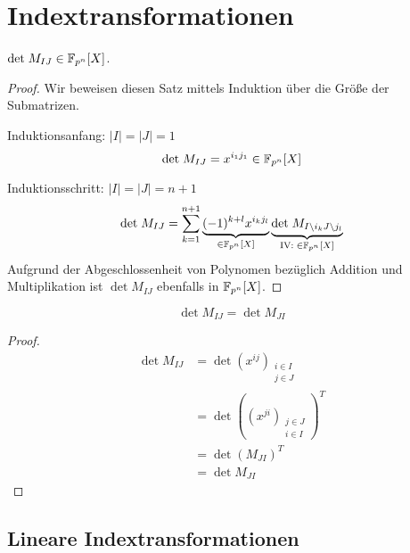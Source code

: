 \section{Indextransformationen}

\begin{lemma} \label{lemma:det-polynom}
    $\det M_{IJ} \in \field{p}[n][X]$.
\end{lemma}

\begin{proof}
    Wir beweisen diesen Satz mittels Induktion über die Größe der Submatrizen. 

    Induktionsanfang: $|I| = |J| = 1$
    \begin{equation*}
        \det M_{IJ} = x^{i_1j_1} \in \field{p}[n][X]
    \end{equation*}

    Induktionsschritt: $|I| = |J| = n+1$
    \begin{equation*}
        \det M_{IJ} = \sum_{k=1}^{n+1} \underbrace{(-1)^{k+l} x^{i_kj_l}}_{\in \field{p}[n][X]} \underbrace{\det M_{I\backslash i_k J \backslash j_l}}_{\mathrm{IV:}\; \in \field{p}[n][X]}
    \end{equation*}
    Aufgrund der Abgeschlossenheit von Polynomen bezüglich Addition und Multiplikation ist $\det M_{IJ}$ ebenfalls in $\field{p}[n][X]$.
\end{proof}

\begin{lemma} \label{lemma:transpose}
    \begin{equation*}
        \det M_{IJ} = \det M_{JI}
    \end{equation*}
\end{lemma}

\begin{proof}
    \begin{align*}
        \det M_{IJ} &= \det (x^{ij})_{\substack{i\in I \\ j\in J}} \\
                    &= \det \left( (x^{ji})_{\substack{j\in J \\ i\in I}} \right)^T \\
                    &= \det \left( M_{JI} \right)^T \\
                    &= \det M_{JI}
    \end{align*}
\end{proof}

\subsection{Lineare Indextransformationen}

